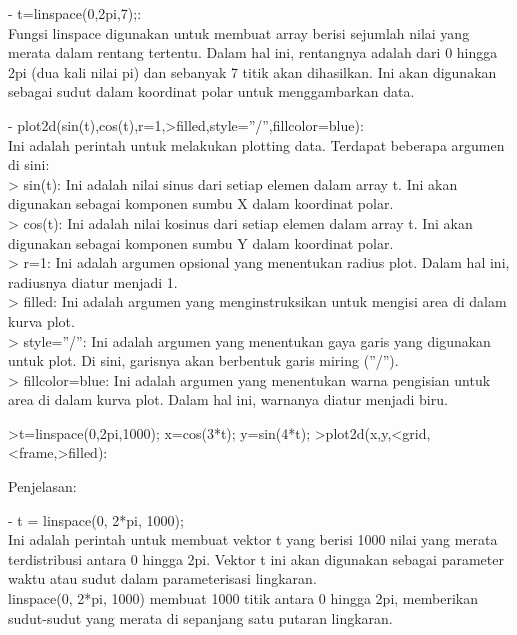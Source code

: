\documentclass{article}
\begin{document}
\begin{eulernotebook}
\begin{eulercomment}
- t=linspace(0,2pi,7);:\\
Fungsi linspace digunakan untuk membuat array berisi sejumlah nilai
yang merata dalam rentang tertentu. Dalam hal ini, rentangnya adalah
dari 0 hingga 2pi (dua kali nilai pi) dan sebanyak 7 titik akan
dihasilkan. Ini akan digunakan sebagai sudut dalam koordinat polar
untuk menggambarkan data.

- plot2d(sin(t),cos(t),r=1,\textgreater{}filled,style=”/”,fillcolor=blue):\\
Ini adalah perintah untuk melakukan plotting data. Terdapat beberapa
argumen di sini:\\
\textgreater{} sin(t): Ini adalah nilai sinus dari setiap elemen dalam array t. Ini
akan digunakan sebagai komponen sumbu X dalam koordinat polar.\\
\textgreater{} cos(t): Ini adalah nilai kosinus dari setiap elemen dalam array t.
Ini akan digunakan sebagai komponen sumbu Y dalam koordinat polar.\\
\textgreater{} r=1: Ini adalah argumen opsional yang menentukan radius plot. Dalam
hal ini, radiusnya diatur menjadi 1.\\
\textgreater{} filled: Ini adalah argumen yang menginstruksikan untuk mengisi area
di dalam kurva plot.\\
\textgreater{} style=”/”: Ini adalah argumen yang menentukan gaya garis yang
digunakan untuk plot. Di sini, garisnya akan berbentuk garis miring
(”/”).\\
\textgreater{} fillcolor=blue: Ini adalah argumen yang menentukan warna pengisian
untuk area di dalam kurva plot. Dalam hal ini, warnanya diatur menjadi
biru.
\end{eulercomment}
\begin{eulerprompt}
>t=linspace(0,2pi,1000); x=cos(3*t); y=sin(4*t);
>plot2d(x,y,<grid,<frame,>filled):
\end{eulerprompt}
\begin{eulercomment}
Penjelasan:

- t = linspace(0, 2*pi, 1000);\\
Ini adalah perintah untuk membuat vektor t yang berisi 1000 nilai yang
merata terdistribusi antara 0 hingga 2pi. Vektor t ini akan digunakan
sebagai parameter waktu atau sudut dalam parameterisasi lingkaran.\\
linspace(0, 2*pi, 1000) membuat 1000 titik antara 0 hingga 2pi,
memberikan sudut-sudut yang merata di sepanjang satu putaran
lingkaran.


\end{eulercomment}
\end{eulernotebook}
\end{document}
